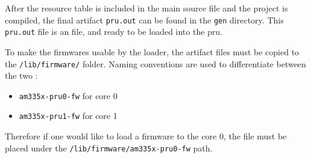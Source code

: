 After the resource table is included in the main source file and the project is compiled, the final artifact \verb|pru.out| can be found in the \verb|gen| directory. This \verb|pru.out| file is an \elf{} file, and ready to be loaded into the pru.

To make the firmwares usable by the loader, the artifact files must be copied to the \verb|/lib/firmware/| folder. Naming conventions are used to differentiate between the two \pru{}:
\begin{itemize}
	\item \verb|am335x-pru0-fw| for \pru{} core 0
	\item \verb|am335x-pru1-fw| for \pru{} core 1
\end{itemize}
Therefore if one would like to load a firmware to the \pru{} core 0, the \elf{} file must be placed under the \verb|/lib/firmware/am335x-pru0-fw| path.
